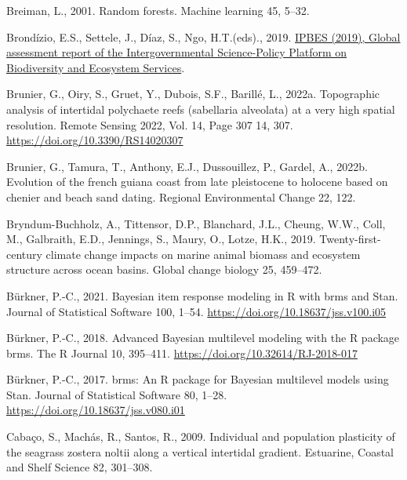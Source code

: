 \documentclass[
  letterpaper,
  11pt,
  english,
  singlespacing,
  headsepline]{MastersDoctoralThesis}
\newlength{\cslhangindent}
\newenvironment{CSLReferences}[2] %
 {\begin{list}{}{%
  \setlength{\itemindent}{0pt}
  \setlength{\leftmargin}{0pt}
  \setlength{\parsep}{0pt}
  \ifodd #1
   \setlength{\leftmargin}{\cslhangindent}
   \setlength{\itemindent}{-1\cslhangindent}
  \fi
  \setlength{\itemsep}{#2\baselineskip}}}
 {\end{list}}
\begin{document}
\begin{CSLReferences}{1}{0}
Breiman, L., 2001. Random forests. Machine learning 45, 5--32.

Brondízio, E.S., Settele, J., Díaz, S., Ngo, H.T.(eds)., 2019.
\href{https://ipbes.net/global-assessment\%0Ahttps://ipbes.net/global-assessment-report-biodiversity-ecosystem-services}{{IPBES
(2019), Global assessment report of the Intergovernmental Science-Policy
Platform on Biodiversity and Ecosystem Services}}.

Brunier, G., Oiry, S., Gruet, Y., Dubois, S.F., Barillé, L., 2022a.
Topographic analysis of intertidal polychaete reefs (sabellaria
alveolata) at a very high spatial resolution. Remote Sensing 2022, Vol.
14, Page 307 14, 307. \url{https://doi.org/10.3390/RS14020307}

Brunier, G., Tamura, T., Anthony, E.J., Dussouillez, P., Gardel, A.,
2022b. Evolution of the french guiana coast from late pleistocene to
holocene based on chenier and beach sand dating. Regional Environmental
Change 22, 122.

Bryndum-Buchholz, A., Tittensor, D.P., Blanchard, J.L., Cheung, W.W.,
Coll, M., Galbraith, E.D., Jennings, S., Maury, O., Lotze, H.K., 2019.
Twenty-first-century climate change impacts on marine animal biomass and
ecosystem structure across ocean basins. Global change biology 25,
459--472.

Bürkner, P.-C., 2021. Bayesian item response modeling in {R} with {brms}
and {Stan}. Journal of Statistical Software 100, 1--54.
\url{https://doi.org/10.18637/jss.v100.i05}

Bürkner, P.-C., 2018. Advanced {Bayesian} multilevel modeling with the
{R} package {brms}. The R Journal 10, 395--411.
\url{https://doi.org/10.32614/RJ-2018-017}

Bürkner, P.-C., 2017. {brms}: An {R} package for {Bayesian} multilevel
models using {Stan}. Journal of Statistical Software 80, 1--28.
\url{https://doi.org/10.18637/jss.v080.i01}

Cabaço, S., Machás, R., Santos, R., 2009. Individual and population
plasticity of the seagrass zostera noltii along a vertical intertidal
gradient. Estuarine, Coastal and Shelf Science 82, 301--308.


\end{CSLReferences}
\end{document}
